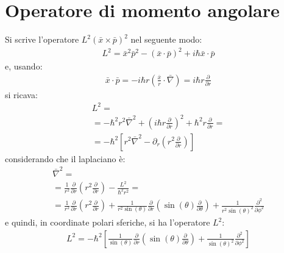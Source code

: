 \section{Operatore di momento angolare} %
Si scrive l'operatore $L^2\left(\bar x\times \bar p\right)^2$ nel seguente modo:
\begin{equation}\begin{split}
L^2=\bar x^2\bar p^2-\left(\bar x\cdot \bar p\right)^2+i\hbar \bar x\cdot \bar p
\end{split}\end{equation}
e, usando:
\begin{equation}\begin{split}
\bar x\cdot \bar p=-i\hbar r\left(\frac{\bar x}{r}\cdot \bar \nabla \right)=i\hbar r\frac{\partial }{\partial r}
\end{split}\end{equation}
si ricava:
\begin{equation}\begin{split}
L^2=\\
=-\hbar ^2r^2\bar \nabla ^2+\left(i\hbar r\frac{\partial }{\partial r}\right)^2+\hbar ^2r\frac{\partial }{\partial r}=\\
=-\hbar ^2\left[r^2\bar \nabla ^2-\partial _r\left(r^2\frac{\partial }{\partial r}\right)\right]
\end{split}\end{equation}
considerando che il laplaciano è:
\begin{equation}\begin{split}
\bar \nabla ^2=\\
=\frac{1}{r^2}\frac{\partial }{\partial r}\left(r^2\frac{\partial }{\partial r}\right)-\frac{L^2}{\hbar ^2r^2}=\\
=\frac{1}{r^2}\frac{\partial }{\partial r}\left(r^2\frac{\partial }{\partial r}\right)+\frac{1}{r^2\sin{\left(\theta\right)}}\frac{\partial }{\partial r}\left(\sin{\left(\theta\right)}\frac{\partial }{\partial \theta}\right)+\frac{1}{r^2\sin{\left(\theta\right)}^2}\frac{\partial ^2}{\partial \phi^2}
\end{split}\end{equation}
e quindi, in coordinate polari sferiche, si ha l'operatore $L^2$:
\begin{equation}\begin{split}
L^2=-\hbar ^2\left[\frac{1}{\sin{\left(\theta\right)}}\frac{\partial }{\partial r}\left(\sin{\left(\theta\right)}\frac{\partial }{\partial \theta}\right)+\frac{1}{\sin{\left(\theta\right)}^2}\frac{\partial ^2}{\partial \phi^2}\right]
\end{split}\end{equation}

